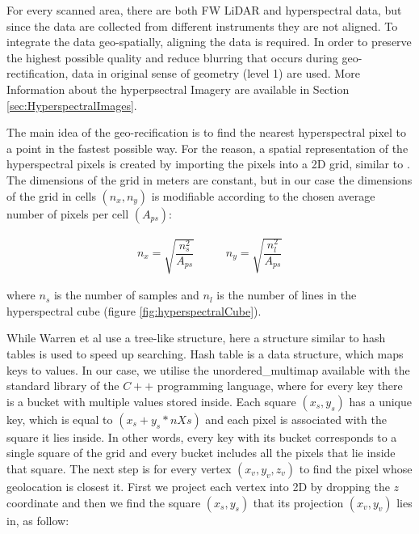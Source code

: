 \documentclass{subfiles}
\begin{document}
	\par For every scanned area, there are both FW LiDAR and hyperspectral data, but since the data are collected from different instruments they are not aligned. To integrate the data geo-spatially, aligning the data is required. In order to preserve the highest possible quality and reduce blurring that occurs during geo-rectification, data in original sense of geometry (level 1) are used. More Information about the hyperpsectral Imagery are available in Section \ref{sec:HyperspectralImages}.
	
	\par The main idea of the geo-recification is to find the nearest hyperspectral pixel to a point in the fastest possible way. For the reason, a spatial representation of the hyperspectral pixels is created by importing the pixels into a 2D grid, similar to \cite{Warren2014}. The dimensions of the grid in meters are constant, but in our case the dimensions of the grid in cells $(n_x, n_y)$ is modifiable according to the chosen average number of pixels per cell $(A_{ps})$: 
	
	\begin{eqnarray}
		n_x=\sqrt{\dfrac{n_s^2}{A_{ps}}} \;\;\;\;\;\;\;\;\;\; n_y=\sqrt{\dfrac{n_l^2}{A_{ps}}}   
	\end{eqnarray} 
	
	\par where $n_s$  is  the number of samples and $n_l$ is the number of lines in the hyperspectral cube (figure \ref{fig:hyperspectralCube}).
	
	\par While Warren et al use a tree-like structure, here a structure similar to hash tables is used to speed up searching. Hash table is a data structure, which maps keys to values. In our case, we utilise the unordered\_multimap available with the standard library of the $C++$ programming language, where for every key there is a bucket with multiple values stored inside. Each square $(x_s,y_s)$	has a unique key, which is equal to $(x_s + y_s *nXs)$ and each pixel is associated with the square it lies inside. In other words, every key with its bucket corresponds to a single square of the grid and every bucket includes all the pixels that lie inside that square. The next step is for every vertex $(x_v, y_v, z_v)$ to find the pixel whose geolocation is closest it. First we project each vertex into 2D by dropping the $z$ coordinate and then we find the square $(x_s , y_s )$ that its projection $(x_v , y_v)$ lies in, as follow: 
	
\end{document}
